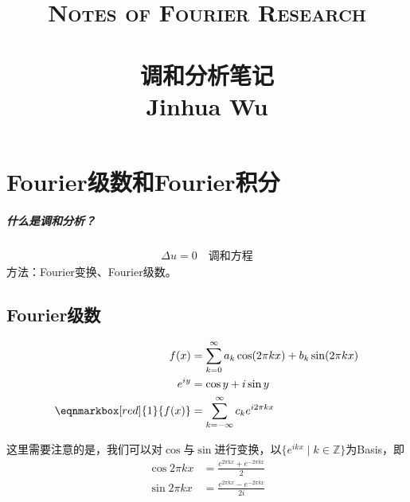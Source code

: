 
\usepackage{float}
\usepackage{enumitem}
\usepackage{amsmath}
\usepackage{amssymb}
\usepackage{hyperref}
\usepackage{cleveref}
\usepackage{annotate-equations}
\usepackage{zhlipsum}

\newcommand\tbbint{{-\mkern -16mu\int}}
\newcommand\tbint{{\mathchar '26\mkern -14mu\int}}
\newcommand\dbbint{{-\mkern -19mu\int}}
\newcommand\dbint{{\mathchar '26\mkern -18mu\int}}
\newcommand\bint{
{\mathchoice{\dbint}{\tbint}{\tbint}{\tbint}}
}
\newcommand\bbint{
{\mathchoice{\dbbint}{\tbbint}{\tbbint}{\tbbint}}
}


\linespread{1.5}
\title{ \normalsize \textsc{Notes of Fourier Research}
		\\ [2.0cm]
		\HRule{1.5pt} \\
		\LARGE \textbf{\uppercase{调和分析笔记}
		\HRule{2.0pt} \\ [0.6cm] \LARGE{Jinhua Wu} \vspace*{10\baselineskip}}
		}
\date{}
\author{}


\maketitle
\tableofcontents 
\newpage
\setcounter{page}{1}
\chapter{Fourier级数和Fourier积分}
\paragraph{什么是调和分析？}
\begin{align*}
    \Delta u = 0 \quad \text{调和方程}
\end{align*}
方法：Fourier变换、Fourier级数。

\section{Fourier级数}
\begin{align*}
    f(x) &= \sum\limits_{k=0}^{\infty} a_k \cos (2\pi kx) + b_k \sin (2\pi kx) \\
    e^{iy} &= \cos y + i\sin y \\
    \eqnmarkbox[red]{1}{f(x)} &= \sum\limits_{k=-\infty}^{\infty} c_k e^{i2\pi kx}
\end{align*}

这里需要注意的是，我们可以对$\cos$与$\sin$进行变换，以$\{e^{ikx}\mid k\in\mathbb{Z}\}$为Basis，即
\begin{align*}
    \cos 2\pi k x &= \frac{e^{2\pi k x} + e^{-2\pi k x}}{2} \\
    \sin 2\pi k x &= \frac{e^{2\pi k x} - e^{-2\pi k x}}{2i} \\
\end{align*}


